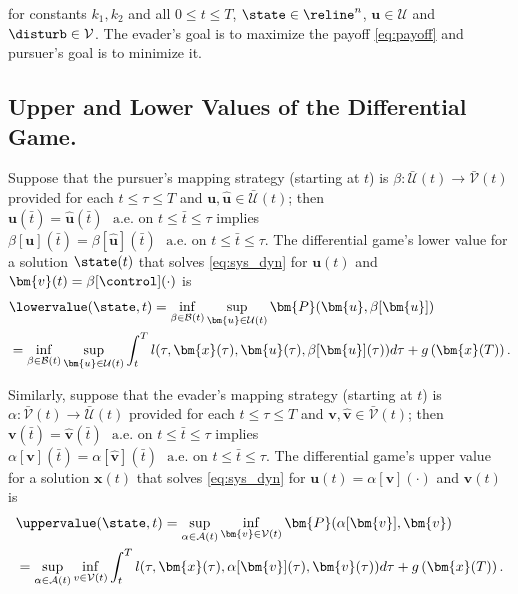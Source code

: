 %
for constants $k_1, k_2$ and all %
 $0 \le t \le T$, $\state \in \reline^n$, $\bm{u}\in \mathcal{U}$ and $\disturb \in \mathcal{V}$. 
The evader's goal is to maximize the payoff \eqref{eq:payoff} and pursuer's goal is to minimize it. %


\subsection{Upper and Lower Values of the Differential Game.}

\noindent Suppose that the pursuer's mapping strategy (starting at $t$) is $\beta: \mathcal{\bar{U}}({t}) \rightarrow \mathcal{\bar{V}}({t})$ provided for each $t \le \tau \le T$ and $\bm{u}, \hat{\bm{u}} \in \mathcal{\bar{U}}({t})$; then $\bm{u}(\bar{t}) = \hat{\bm{u}}(\bar{t}) \,\, \text{ a.e. on } t \le \bar{t}  \le \tau$ implies $\beta[\bm{u}](\bar{t}) = \beta[\hat{\bm{u}}](\bar{t}) \,\, \text{ a.e. on } t \le \bar{t}  \le \tau$.
%
The differential game's lower value for a solution $\state(t)$ that solves \eqref{eq:sys_dyn} for $\bm{u}(t)$ and $\bm{v}(t) = \beta[\control](\cdot)$ is 
%
\begin{align}
	&\lowervalue(\state, t) = \inf_{\beta \in \mathcal{B}(t)} \sup_{\bm{u} \in \mathcal{U}(t)} \bm{P}(\bm{u}, \beta[\bm{u}]) \nonumber \\
	&=  \inf_{\beta \in \mathcal{B}(t)} \sup_{\bm{u} \in \mathcal{U}(t)} %
	\int_{t}^{T} l(\tau, \bm{x}(\tau), \bm{u}(\tau), \beta[\bm{u}](\tau)) d\tau + g\left(\bm{x}(T)\right). %
	\label{eq:value_lower}
\end{align}

Similarly, suppose that  the evader's mapping strategy (starting at $t$) is $\alpha: \mathcal{\bar{V}}({t}) \rightarrow \mathcal{\bar{U}}({t})$ provided for each $t \le \tau \le T$ and $\bm{v}, \hat{\bm{v}} \in \mathcal{\bar{V}}({t})$; then  $\bm{v}(\bar{t}) = \hat{\bm{v}}(\bar{t}) \,\, \text{ a.e. on } t \le \bar{t}  \le \tau$ implies $\alpha[\bm{v}](\bar{t}) = \alpha[\hat{\bm{v}}](\bar{t}) \,\, \text{ a.e. on } t \le \bar{t}  \le \tau$. The differential game's upper value for a solution $\bm{x}(t)$ that solves \eqref{eq:sys_dyn} for $\bm{u}(t) = \alpha[\bm{v}](\cdot)$ and $\bm{v}(t)$  is 
%
\begin{align}
	&\uppervalue(\state, t) = \sup_{\alpha \in \mathcal{A}(t)} \inf_{\bm{v} \in \mathcal{V}(t)}  \bm{P}(\alpha[\bm{v}], \bm{v}) \nonumber \\
	&=  \sup_{\alpha \in \mathcal{A}(t)} \inf_{v \in \mathcal{V}(t)} %
	\int_{t}^{T}l(\tau, \bm{x}(\tau), \alpha[\bm{v}](\tau), \bm{v}(\tau)) d\tau  + g\left(\bm{x}(T)\right).
	\label{eq:value_upper}
\end{align}

